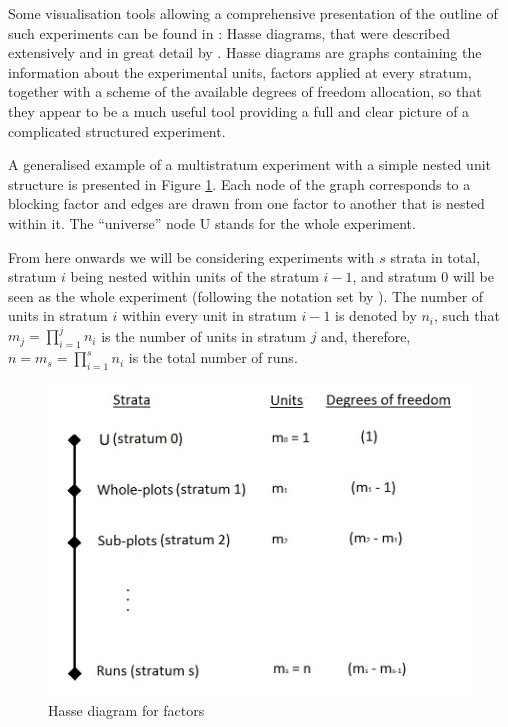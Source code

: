 \documentclass[11pt]{article}
\begin{document}
Some visualisation tools allowing a comprehensive presentation of the outline of such experiments can be found in \cite{Goos2012Hasse}: Hasse diagrams, that were described extensively and in great detail by \cite{Bailey2008design}. Hasse diagrams are graphs containing the information about the experimental units, factors applied at every stratum, together with a scheme of the available degrees of freedom allocation, so that they appear to be a much useful tool providing a full and clear picture of a complicated structured experiment. 

A generalised example of a multistratum experiment with a simple nested unit structure is presented in Figure \ref{Fig::Hasse}. Each node of the graph corresponds to a blocking factor and edges are drawn from one factor to another that is nested within it. The ``universe'' node U stands for the whole experiment.

From here onwards we will be considering experiments with $s$ strata in total, stratum $i$ being nested within units of the stratum $i-1$, and stratum $0$ will be seen as the whole experiment (following the notation set by \citet{Trinca2015improved}). The number of units in stratum $i$ within every unit in stratum $i-1$ is denoted by $n_i$, such that $m_{j}=\prod_{i=1}^{j}n_{i}$ is the number of units in stratum $j$ and, therefore,  $n=m_{s}=\prod_{i=1}^{s}n_{i}$ is the total number of runs.

\begin{figure}[h]
\begin{center}
\includegraphics[scale=0.85]{Hasse.jpg}      %
\caption{Hasse diagram for factors}
\label{Fig::Hasse}
\end{center}
\end{figure} 
 
\end{document}
